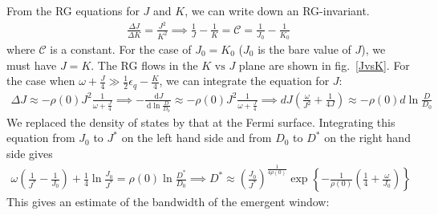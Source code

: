 \documentclass[12pt,twoside]{report}
\numberwithin{equation}{section}
\begin{document}
From the RG equations for \(J\) and \(K\), we can write down an RG-invariant.
\begin{equation}\begin{aligned}
	\label{rginv}
	\frac{\Delta J}{\Delta K} = \frac{J^2}{K^2} \implies \frac{1}{J} - \frac{1}{K} = \mathcal{C} = \frac{1}{J_0} - \frac{1}{K_0}
\end{aligned}\end{equation}
where \(\mathcal{C}\) is a constant. For the case of \(J_0 = K_0\) (\(J_0\) is the bare value of \(J\)), we must have \(J=K\). The RG flows in the \(K \text{ vs } J\) plane are shown in fig.~\ref{JvsK}.
\pb For the case when \(\omega + \frac{J}{4} \gg \frac{1}{2}\epsilon_q - \frac{K}{4}\), we can integrate the equation for \(J\):
\begin{equation}\begin{aligned}
	\Delta J \approx -\rho(0) J^2 \frac{1}{\omega + \frac{J}{4}}  \implies -\frac{\:\mathrm{d}J}{\:\mathrm{d}\ln \frac{D}{D_0}} \approx-\rho(0) J^2 \frac{1}{\omega + \frac{J}{4}} \implies dJ\left( \frac{\omega}{J^2} + \frac{1}{4J} \right) \approx -\rho(0) d\ln \frac{D}{D_0}
\end{aligned}\end{equation}
We replaced the density of states by that at the Fermi surface. Integrating this equation from \(J_0\) to \(J^*\) on the left hand side and from \(D_0\) to \(D^*\) on the right hand side gives
\begin{equation}\begin{aligned}
	\omega\left( \frac{1}{J^*} - \frac{1}{J_0}\right) + \frac{1}{4}\ln \frac{J_0}{J^*} = \rho(0)\ln\frac{D^*}{D_0} \implies D^* \approx \left( \frac{J_0}{J^*} \right) ^\frac{1}{4\rho(0)} \exp\left\{-\frac{1}{\rho(0)}\left( \frac{1}{4} + \frac{\omega}{J_0} \right)\right\}
\end{aligned}\end{equation}
This gives an estimate of the bandwidth of the emergent window:
\end{document}
